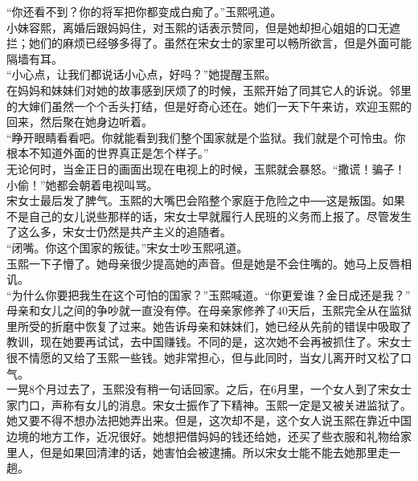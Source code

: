 \begin{multicols}{\theparacolNo}
“你还看不到？你的将军把你都变成白痴了。”玉熙吼道。\\

小妹容熙，离婚后跟妈妈住，对玉熙的话表示赞同，但是她却担心姐姐的口无遮拦；她们的麻烦已经够多得了。虽然在宋女士的家里可以畅所欲言，但是外面可能隔墙有耳。\\

“小心点，让我们都说话小心点，好吗？”她提醒玉熙。\\

在妈妈和妹妹们对她的故事感到厌烦了的时候，玉熙开始了同其它人的诉说。邻里的大婶们虽然一个个舌头打结，但是好奇心还在。她们一天下午来访，欢迎玉熙的回来，然后聚在她身边听着。\\

“睁开眼睛看看吧。你就能看到我们整个国家就是个监狱。我们就是个可怜虫。你根本不知道外面的世界真正是怎个样子。”\\

无论何时，当金正日的画面出现在电视上的时候，玉熙就会暴怒。“撒谎！骗子！小偷！”她都会朝着电视叫骂。\\

宋女士最后发了脾气。玉熙的大嘴巴会陷整个家庭于危险之中──这是叛国。如果不是自己的女儿说些那样的话，宋女士早就履行人民班的义务而上报了。尽管发生了这么多，宋女士仍然是共产主义的追随者。\\

“闭嘴。你这个国家的叛徒。”宋女士吵玉熙吼道。\\

玉熙一下子懵了。她母亲很少提高她的声音。但是她是不会住嘴的。她马上反唇相讥。\\

“为什么你要把我生在这个可怕的国家？”玉熙喊道。“你更爱谁？金日成还是我？”\\

母亲和女儿之间的争吵就一直没有停。在母亲家修养了40天后，玉熙完全从在监狱里所受的折磨中恢复了过来。她告诉母亲和妹妹们，她已经从先前的错误中吸取了教训，现在她要再试试，去中国赚钱。不同的是，这次她不会再被抓住了。宋女士很不情愿的又给了玉熙一些钱。她非常担心，但与此同时，当女儿离开时又松了口气。\\

一晃8个月过去了，玉熙没有稍一句话回家。之后，在6月里，一个女人到了宋女士家门口，声称有女儿的消息。宋女士振作了下精神。玉熙一定是又被关进监狱了。她又要不得不想办法把她弄出来。但是，这次却不是，这个女人说玉熙在靠近中国边境的地方工作，近况很好。她想把借妈妈的钱还给她，还买了些衣服和礼物给家里人，但是如果回清津的话，她害怕会被逮捕。所以宋女士能不能去她那里走一趟。\\


\end{multicols}
